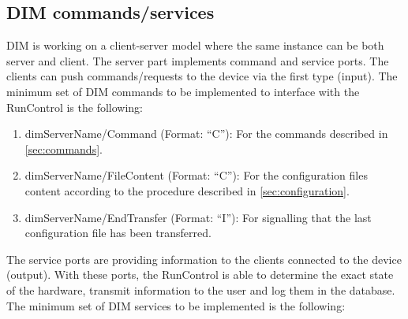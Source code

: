 \documentclass[a4paper]{article}
\begin{document}
\subsection{DIM commands/services} \label{sec:DIM}
DIM is working on a client-server model where the same instance can be both server and client.
The server part implements command and service ports. The clients can push commands/requests to
the device via the first type (input). The minimum set of DIM commands to be implemented to
interface with the RunControl is the following:
\begin{enumerate}[label=\textbf{CMD.\arabic*}]
	\item \label{cmd:command} dimServerName/Command (Format: ``C''): For the commands described in
	\ref{sec:commands}.
	\item \label{cmd:fileContent} dimServerName/FileContent (Format: ``C''): For the configuration
	files content according to the procedure described in \ref{sec:configuration}.
	\item \label{cmd:endTransfer} dimServerName/EndTransfer (Format: ``I''): For signalling that the
	last configuration file has been transferred.
\end{enumerate}
The service ports are providing information to the clients connected to the device (output).
With these ports, the RunControl is able to determine the exact state of the hardware,
transmit information to the user and log them in the database. The minimum set of DIM services to
be implemented is the following:
\end{document}
